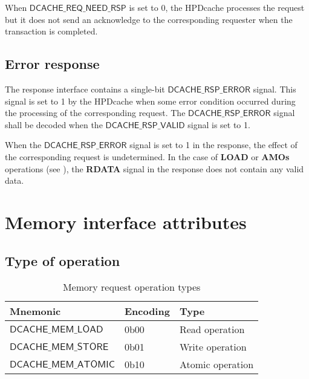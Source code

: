 \documentclass[10pt,titlepage,twoside]{book}
\begin{document}
When $\mathsf{DCACHE\_REQ\_NEED\_RSP}$ is set to 0, the \ac{HPDcache} processes the request but it does not send an acknowledge to the corresponding requester when the transaction is completed.


\subsection{Error response}%

The response interface contains a single-bit $\mathsf{DCACHE\_RSP\_ERROR}$ signal.
This signal is set to 1 by the \ac{HPDcache} when some error condition occurred during the processing of the corresponding request.
The $\mathsf{DCACHE\_RSP\_ERROR}$ signal shall be decoded when the $\mathsf{DCACHE\_RSP\_VALID}$ signal is set to 1.

When the $\mathsf{DCACHE\_RSP\_ERROR}$ signal is set to 1 in the response, the effect of the corresponding request is undetermined.
In the case of \textbf{LOAD} or \textbf{AMOs} operations (see ), the \textbf{RDATA} signal in the response does not contain any valid data.


\clearpage
\section{Memory interface attributes}

\subsection{Type of operation}%

\begin{table}[h!]
\begin{center}
\caption{Memory request operation types}%
{\footnotesize
\begin{tabular}{lll}
  \toprule
  \textbf{Mnemonic}
  & \textbf{Encoding}
  & \textbf{Type} \\
  \midrule
  $\mathsf{DCACHE\_MEM\_LOAD}$
  & 0b00
  & Read operation \\
  \midrule
  $\mathsf{DCACHE\_MEM\_STORE}$
  & 0b01
  & Write operation \\
  \midrule
  $\mathsf{DCACHE\_MEM\_ATOMIC}$
  & 0b10
  & Atomic operation \\
\end{tabular}}
\end{center}
\end{table}
\end{document}
